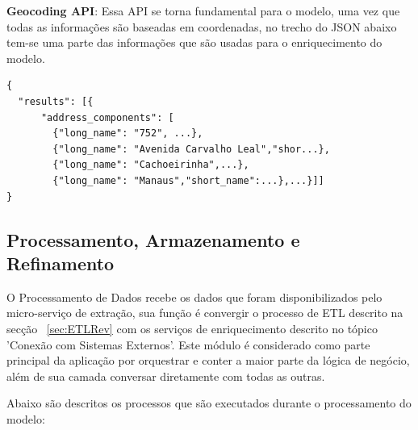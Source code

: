 \documentclass[12pt]{article}
\begin{document}
\textbf{Geocoding API}: Essa API se torna fundamental para o modelo, uma vez que todas as informações são baseadas em coordenadas, no trecho do JSON abaixo tem-se uma parte das informações que são usadas para o enriquecimento do modelo.

\begin{lstlisting}
{
  "results": [{
      "address_components": [
        {"long_name": "752", ...},
        {"long_name": "Avenida Carvalho Leal","shor...},
        {"long_name": "Cachoeirinha",...},
        {"long_name": "Manaus","short_name":...},...}]]
}
\end{lstlisting}

\subsection{Processamento, Armazenamento e Refinamento}
O Processamento de Dados recebe os dados que foram disponibilizados pelo micro-serviço de extração, sua função é convergir o processo de ETL descrito na secção ~\ref{sec:ETLRev} com os serviços de enriquecimento descrito no tópico 'Conexão com Sistemas Externos'. Este módulo é considerado como parte principal da aplicação por orquestrar e conter a maior parte da lógica de negócio, além de sua camada conversar diretamente com todas as outras. 

Abaixo são descritos os processos que são executados durante o processamento do modelo:
\end{document}
